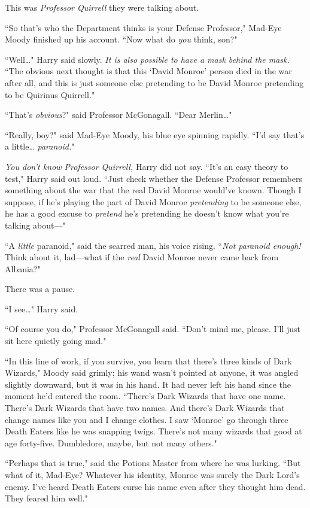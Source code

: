 This was \emph{Professor Quirrell} they were talking about.

``So that's who the Department thinks is your Defense Professor," Mad-Eye Moody finished up his account. ``Now what do \emph{you} think, son?"

``Well{\ldots}" Harry said slowly. \emph{It is also possible to have a mask behind the mask.} ``The obvious next thought is that this `David Monroe' person died in the war after all, and this is just someone else pretending to be David Monroe pretending to be Quirinus Quirrell."

``That's \emph{obvious}?" said Professor McGonagall. ``Dear Merlin{\ldots}"

``Really, boy?" said Mad-Eye Moody, his blue eye spinning rapidly. ``I'd say that's a little{\ldots} \emph{paranoid.}"

\emph{You don't know Professor Quirrell,} Harry did not say. ``It's an easy theory to test," Harry said out loud. ``Just check whether the Defense Professor remembers something about the war that the real David Monroe would've known. Though I suppose, if he's playing the part of David Monroe \emph{pretending} to be someone else, he has a good excuse to \emph{pretend} he's pretending he doesn't know what you're talking about—"

``A \emph{little} paranoid," said the scarred man, his voice rising. ``\emph{Not paranoid enough! } Think about it, lad—what if the \emph{real} David Monroe never came back from Albania?"

There was a pause.

``I see{\ldots}" Harry said.

``Of course you do," Professor McGonagall said. ``Don't mind me, please. I'll just sit here quietly going mad."

``In this line of work, if you survive, you learn that there's three kinds of Dark Wizards," Moody said grimly; his wand wasn't pointed at anyone, it was angled slightly downward, but it was in his hand. It had never left his hand since the moment he'd entered the room. ``There's Dark Wizards that have one name. There's Dark Wizards that have two names. And there's Dark Wizards that change names like you and I change clothes. I saw `Monroe' go through three Death Eaters like he was snapping twigs. There's not many wizards that good at age forty-five. Dumbledore, maybe, but not many others."

``Perhaps that is true," said the Potions Master from where he was lurking. ``But what of it, Mad-Eye? Whatever his identity, Monroe was surely the Dark Lord's enemy. I've heard Death Eaters curse his name even after they thought him dead. They feared him well."

